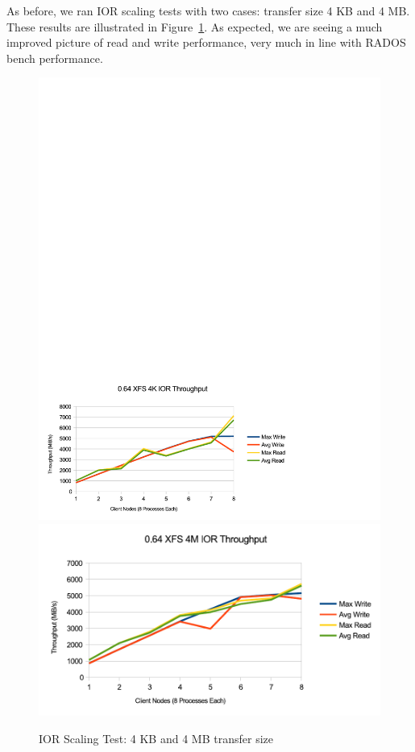 \documentclass{article}
\begin{document}
As before, we ran IOR scaling tests with two cases: transfer size 4 KB and 4 MB.
These results are illustrated in Figure~\ref{fig:ior-064}. As expected, we are
seeing a much improved picture of read and write performance, very much in
line with RADOS bench performance.


\begin{figure}[htb]
\centering
\includegraphics[width=5in]{ior-064-4k}
\includegraphics[width=5in]{ior-064-4m}
\caption{IOR Scaling Test: 4 KB and 4 MB transfer size}
\label{fig:ior-064}
\end{figure}
\end{document}
